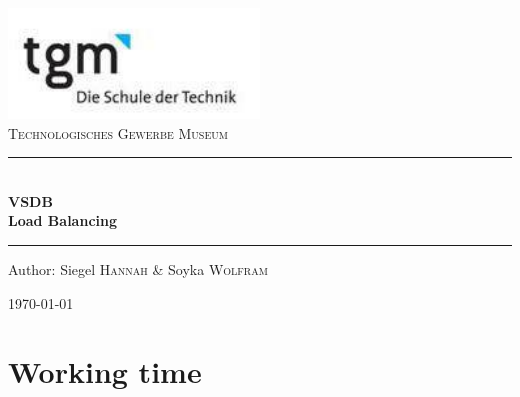 \documentclass[12pt]{article}
\begin{document}
\begin{titlepage}
\begin{center}
\includegraphics[width=0.5\textwidth]{images/logo}\\[1cm]    

\textsc{\LARGE Technologisches Gewerbe Museum}\\[1.5cm]

\rule{1.0\textwidth}{1mm}
{ \huge \bfseries  \\\large VSDB \\ \huge Load Balancing \\[0.4cm] }

\rule{1.0\textwidth}{1mm}

\noindent 
\vspace{7cm}

\begin{center}
\large
Author: 
Siegel \textsc{Hannah} \&
Soyka \textsc{Wolfram}
\end{center}

\vfill

{\large \today}

\end{center}
\end{titlepage}

\tableofcontents


\ohead{\headmark}

\newpage


\tableofcontents
\section{Working time}
\end{document}

